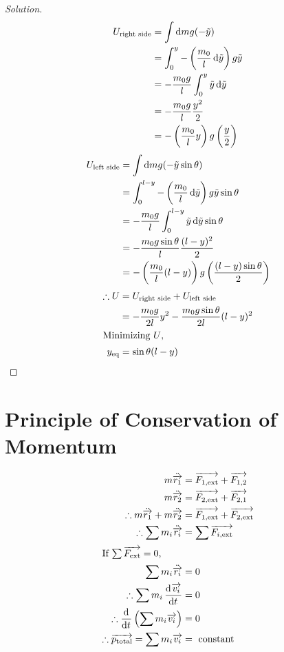 \documentclass[fleqn]{article}
\theoremstyle{definition}
\theoremstyle{theorem}
\newenvironment{solution}
{\begin{proof}[Solution]\let\qed\relax}
	{\end{proof}}
\begin{document}
\begin{solution}
	\begin{align*}
		U_{\text{right side}} &= \int \dif m g (-\tilde{y}) \\
		&= \int_{0}^{y} - \left(\dfrac{m_0}{l} \dif \tilde{y}\right) g \tilde{y}\\
		&= - \dfrac{m_0 g}{l} \int_{0}^{y} \tilde{y} \dif \tilde{y} \\
		&= - \dfrac{m_0 g}{l} \dfrac{y^2}{2} \\
		&= - \left(\dfrac{m_0}{l} y\right) g \left(\dfrac{y}{2}\right)
	\end{align*}
	\begin{align*}
		U_{\text{left side}} &= \int \dif m g (-\tilde{y} \sin \theta)\\
		&= \int_{0}^{l - y} - \left(\dfrac{m_0}{l} \dif \tilde{y}\right) g \tilde{y} \sin \theta\\
		&= - \dfrac{m_0 g}{l} \int_{0}^{l - y} \tilde{y} \dif \tilde{y} \sin \theta\\
		&= - \dfrac{m_0 g \sin \theta}{l} \dfrac{(l - y)^2}{2} \\
		&= - \left(\dfrac{m_0}{l} (l - y)\right) g \left(\dfrac{(l - y) \sin \theta}{2}\right)
	\end{align*}
	\begin{align*}
		\therefore U &= U_{\text{right side}} + U_{\text{left side}}\\
		&= - \dfrac{m_0 g}{2l} y^2 - \dfrac{m_0 g \sin \theta}{2l} (l - y)^2\\
		\intertext{Minimizing $U$,}
		y_{\text{eq}} &= \sin \theta (l - y)
	\end{align*}
\end{solution}

\section{Principle of Conservation of Momentum}

\begin{align*}
	m \ddot{\overrightarrow{r_1}} &= \overrightarrow{F_{1,\text{ext}}} + \overrightarrow{F_{1,2}}\\
	m \ddot{\overrightarrow{r_2}} &= \overrightarrow{F_{2,\text{ext}}} + \overrightarrow{F_{2,1}}\\
	\therefore m \ddot{\overrightarrow{r_1}} + m \ddot{\overrightarrow{r_2}} &= \overrightarrow{F_{1,\text{ext}}} + \overrightarrow{F_{2,\text{ext}}}\\
	\therefore \sum m_i \ddot{\overrightarrow{r_i}} &= \sum \overrightarrow{F_{i,\text{ext}}}\\
	\intertext{If $\sum \overrightarrow{F_{\text{ext}}} = 0$,}
	\sum m_i \ddot{\overrightarrow{r_i}} &= 0\\
	\therefore \sum m_i \dod{\overrightarrow{v_i}}{t} &= 0\\
	\therefore \dod{}{t}\left(\sum m_i \overrightarrow{v_i}\right)&= 0\\
	\therefore \overrightarrow{p_{\text{total}}} = \sum m_i \overrightarrow{v_i} &= \text{ constant }
\end{align*}
\end{document}
